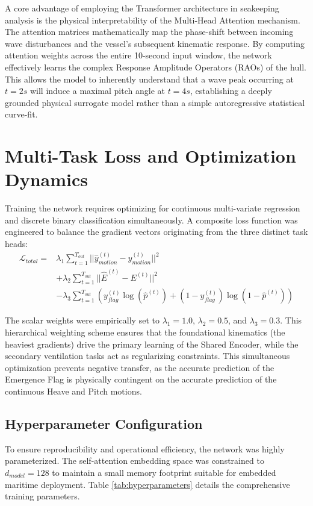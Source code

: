 A core advantage of employing the Transformer architecture in seakeeping analysis is the physical interpretability of the Multi-Head Attention mechanism. The attention matrices mathematically map the phase-shift between incoming wave disturbances and the vessel's subsequent kinematic response. By computing attention weights across the entire 10-second input window, the network effectively learns the complex Response Amplitude Operators (RAOs) of the hull. This allows the model to inherently understand that a wave peak occurring at $t=2s$ will induce a maximal pitch angle at $t=4s$, establishing a deeply grounded physical surrogate model rather than a simple autoregressive statistical curve-fit.

\section{Multi-Task Loss and Optimization Dynamics}
Training the network requires optimizing for continuous multi-variate regression and discrete binary classification simultaneously. A composite loss function was engineered to balance the gradient vectors originating from the three distinct task heads:
\begin{equation}
\begin{aligned}
    \mathcal{L}_{total} = {} & \lambda_1 \sum_{t=1}^{T_{out}} ||\hat{y}_{motion}^{(t)} - y_{motion}^{(t)}||^2 \\
    & + \lambda_2 \sum_{t=1}^{T_{out}} ||\hat{E}^{(t)} - E^{(t)}||^2 \\
    & - \lambda_3 \sum_{t=1}^{T_{out}} \left( y_{flag}^{(t)} \log(\hat{p}^{(t)}) + (1 - y_{flag}^{(t)}) \log(1 - \hat{p}^{(t)}) \right)
\end{aligned}
\end{equation}

The scalar weights were empirically set to $\lambda_1 = 1.0$, $\lambda_2 = 0.5$, and $\lambda_3 = 0.3$. This hierarchical weighting scheme ensures that the foundational kinematics (the heaviest gradients) drive the primary learning of the Shared Encoder, while the secondary ventilation tasks act as regularizing constraints. This simultaneous optimization prevents negative transfer, as the accurate prediction of the Emergence Flag is physically contingent on the accurate prediction of the continuous Heave and Pitch motions.

\subsection{Hyperparameter Configuration}
To ensure reproducibility and operational efficiency, the network was highly parameterized. The self-attention embedding space was constrained to $d_{model}=128$ to maintain a small memory footprint suitable for embedded maritime deployment. Table \ref{tab:hyperparameters} details the comprehensive training parameters.

